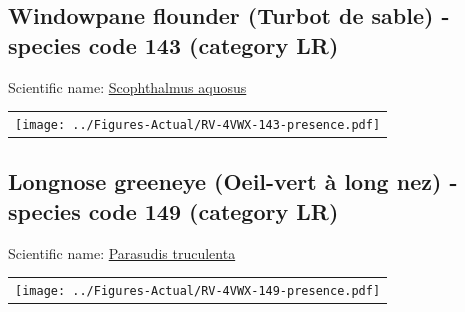 \documentclass[12pt]{article}\usepackage[]{graphicx}\usepackage[]{color}
\begin{document}
\renewcommand\thefigure{\thesubsection\Alph{figure}}

\setcounter{figure}{0}

\hypertarget{sec:143}{%
\subsection{Windowpane flounder (Turbot de sable) - species code 143 (category LR)}\label{sec:143}}

  


Scientific name: \href{http://www.marinespecies.org/aphia.php?p=taxdetails\&id=158907}{Scophthalmus aquosus} \newline
\begin{minipage}{1.0\textwidth}
 \begin{tabular}{c}
\texttt{[image: ../Figures-Actual/RV-4VWX-143-presence.pdf]} \\ 
\end{tabular} 
\end{minipage}
\clearpage

\renewcommand\thefigure{\thesubsection\Alph{figure}}

\setcounter{figure}{0}

\hypertarget{sec:149}{%
\subsection{Longnose greeneye (Oeil-vert à long nez) - species code 149 (category LR)}\label{sec:149}}

  


Scientific name: \href{http://www.marinespecies.org/aphia.php?p=taxdetails\&id=158868}{Parasudis truculenta} \newline
\begin{minipage}{1.0\textwidth}
 \begin{tabular}{c}
\texttt{[image: ../Figures-Actual/RV-4VWX-149-presence.pdf]} \\ 
\end{tabular} 
\end{minipage}
\clearpage
\end{document}
